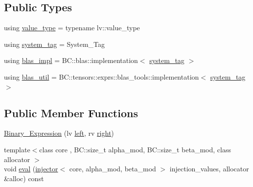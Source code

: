\subsection*{Public Types}
\begin{DoxyCompactItemize}
\item 
using \hyperlink{structBC_1_1tensors_1_1exprs_1_1Binary__Expression_3_01oper_1_1dot_3_01System__Tag_01_4_00_01lv_00_01rv_01_4_a531c879cb72017483e3e44e04c4cdf03}{value\+\_\+type} = typename lv\+::value\+\_\+type
\item 
using \hyperlink{structBC_1_1tensors_1_1exprs_1_1Binary__Expression_3_01oper_1_1dot_3_01System__Tag_01_4_00_01lv_00_01rv_01_4_a6bcdb75bc19af9d195674fb88f7f9e02}{system\+\_\+tag} = System\+\_\+\+Tag
\item 
using \hyperlink{structBC_1_1tensors_1_1exprs_1_1Binary__Expression_3_01oper_1_1dot_3_01System__Tag_01_4_00_01lv_00_01rv_01_4_a5e92bf290b7bb66e9c9f6a9a5739aacf}{blas\+\_\+impl} = B\+C\+::blas\+::implementation$<$ \hyperlink{structBC_1_1tensors_1_1exprs_1_1Binary__Expression_3_01oper_1_1dot_3_01System__Tag_01_4_00_01lv_00_01rv_01_4_a6bcdb75bc19af9d195674fb88f7f9e02}{system\+\_\+tag} $>$
\item 
using \hyperlink{structBC_1_1tensors_1_1exprs_1_1Binary__Expression_3_01oper_1_1dot_3_01System__Tag_01_4_00_01lv_00_01rv_01_4_ad7ee221fc688c3b58ba212c5957ed983}{blas\+\_\+util} = B\+C\+::tensors\+::exprs\+::blas\+\_\+tools\+::implementation$<$ \hyperlink{structBC_1_1tensors_1_1exprs_1_1Binary__Expression_3_01oper_1_1dot_3_01System__Tag_01_4_00_01lv_00_01rv_01_4_a6bcdb75bc19af9d195674fb88f7f9e02}{system\+\_\+tag} $>$
\end{DoxyCompactItemize}
\subsection*{Public Member Functions}
\begin{DoxyCompactItemize}
\item 
\hyperlink{structBC_1_1tensors_1_1exprs_1_1Binary__Expression_3_01oper_1_1dot_3_01System__Tag_01_4_00_01lv_00_01rv_01_4_a12e199e2ce522aa9fb0fcf850f0d4c46}{Binary\+\_\+\+Expression} (lv \hyperlink{structBC_1_1tensors_1_1exprs_1_1Binary__Expression_3_01oper_1_1dot_3_01System__Tag_01_4_00_01lv_00_01rv_01_4_a17d0cd14365a29c0aa10cba3f9d57c04}{left}, rv \hyperlink{structBC_1_1tensors_1_1exprs_1_1Binary__Expression_3_01oper_1_1dot_3_01System__Tag_01_4_00_01lv_00_01rv_01_4_ac16bea75afa747671af04ba484694a19}{right})
\item 
{\footnotesize template$<$class core , B\+C\+::size\+\_\+t alpha\+\_\+mod, B\+C\+::size\+\_\+t beta\+\_\+mod, class allocator $>$ }\\void \hyperlink{structBC_1_1tensors_1_1exprs_1_1Binary__Expression_3_01oper_1_1dot_3_01System__Tag_01_4_00_01lv_00_01rv_01_4_af7e79c05059441aabf4ea6cf585b750e}{eval} (\hyperlink{structBC_1_1tensors_1_1exprs_1_1injector}{injector}$<$ core, alpha\+\_\+mod, beta\+\_\+mod $>$ injection\+\_\+values, allocator \&alloc) const 
\end{DoxyCompactItemize}

